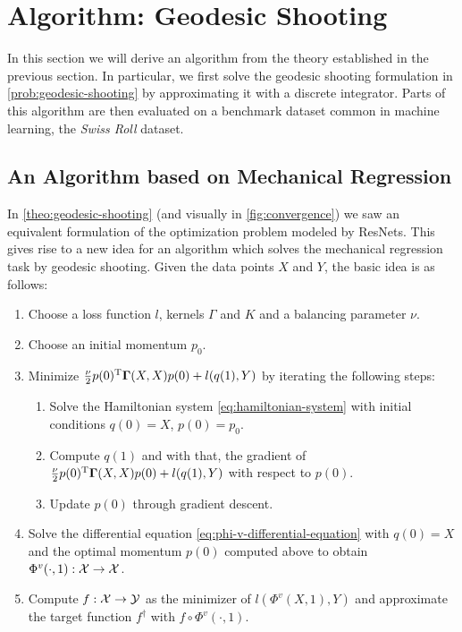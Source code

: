 \section{Algorithm: Geodesic Shooting}
\label{sec:algorithm}

In this section we will derive an algorithm from the theory established in the previous section.
In particular, we first solve the geodesic shooting formulation in \cref{prob:geodesic-shooting} by approximating it with a discrete integrator.
Parts of this algorithm are then evaluated on a benchmark dataset common in machine learning, the \emph{Swiss Roll} dataset.

\subsection{An Algorithm based on Mechanical Regression}

In \cref{theo:geodesic-shooting} (and visually in \cref{fig:convergence}) we saw an equivalent formulation of the optimization problem modeled by ResNets.
This gives rise to a new idea for an algorithm which solves the mechanical regression task by geodesic shooting.
Given the data points $X$ and $Y$, the basic idea is as follows:
\begin{enumerate}[label=\arabic*.]
	\item Choose a loss function $l$, kernels $\Gamma$ and $K$ and a balancing parameter $\nu$.
	\item Choose an initial momentum $p_0$.
	\item Minimize $\frac{\nu}{2} p(0)^{\mathrm{T}} \mathbf{\Gamma}(X, X)p(0) + l(q(1), Y)$ by iterating the following steps:
	\begin{enumerate}[label=3.\arabic*.]
		\item Solve the Hamiltonian system \ref{eq:hamiltonian-system} with initial conditions $q(0) = X$, $p(0) = p_0$.
		\item Compute $q(1)$ and with that, the gradient of $\frac{\nu}{2} p(0)^{\mathrm{T}} \mathbf{\Gamma}(X, X)p(0) + l(q(1), Y)$ with respect to $p(0)$.
		\item Update $p(0)$ through gradient descent.
	\end{enumerate}
	\item Solve the differential equation \ref{eq:phi-v-differential-equation} with $q(0) = X$ and the optimal momentum $p(0)$ computed above to obtain $\Phi^v(\cdot, 1): \mathcal{X} \rightarrow \mathcal{X}$.
	\item Compute $f: \mathcal{X} \rightarrow \mathcal{Y}$ as the minimizer of $l(\Phi^v(X, 1), Y)$ and approximate the target function $f^\dagger$ with $f \circ \Phi^v(\cdot, 1)$.
\end{enumerate}

